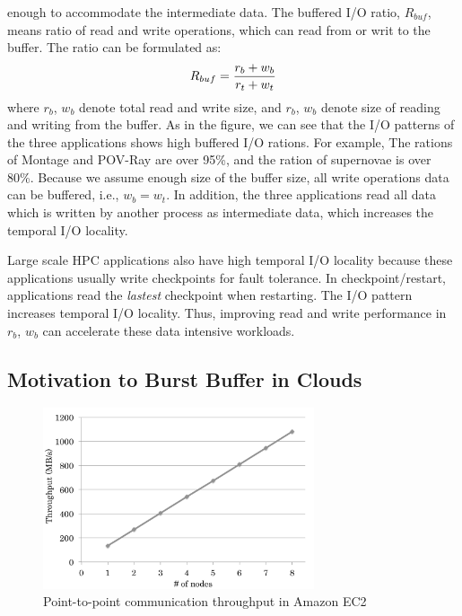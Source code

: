 enough to accommodate the intermediate data.
The buffered I/O ratio, $R_{buf}$, means
ratio of read and write operations, which can read from or writ to the buffer.
The ratio can be formulated as:
\begin{equation}
R_{buf} = \frac{r_{b} + w_{b}}{r_{t} + w_{t}} \\
\end{equation}
where $r_{b}$, $w_{b}$ denote total read and write size, and $r_{b}$, $w_{b}$
denote size of reading and writing from the buffer. 
As in the figure, we can see that the I/O patterns of the three applications
shows high buffered I/O rations. For example, The rations of Montage and POV-Ray
are over 95\%, and the ration of supernovae is over 80\%.
Because we assume enough size of the buffer size, all write operations data can
be buffered, i.e., $w_{b} = w_{t}$.
 In addition, the three applications
read all data which is written by another process as intermediate data, which
increases the temporal I/O locality.
\par
 Large scale HPC applications also have high temporal I/O
locality because these applications usually write checkpoints for fault
tolerance. 
In checkpoint/restart, applications read the \emph{lastest} checkpoint when
restarting. The I/O pattern increases temporal I/O locality. 
Thus, improving read and write performance in $r_{b}$, $w_{b}$ can accelerate
these data intensive workloads.



\subsection{Motivation to Burst Buffer in Clouds}
\label{ssec:network_s3}

\begin{figure}
\centering
\includegraphics[width=8cm]{img/point_to_point-2}
\caption{Point-to-point communication throughput in Amazon EC2}
\label{background:Amazon point to point throughput}
\end{figure}


